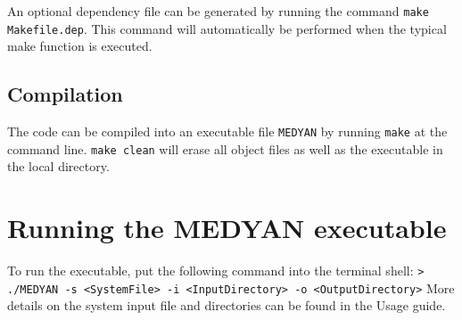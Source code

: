 \documentclass[11pt, oneside]{article}   	%
\begin{document}
An optional dependency file can be generated by running the command  \texttt{make Makefile.dep}. This command will automatically be performed when the typical make function is executed.

\subsection{Compilation}

The code can be compiled into an executable file \texttt{MEDYAN} by running \texttt{make} at the command line. \texttt{make clean} will erase all object files as well as the executable in the local directory.

\section {Running the MEDYAN executable}

To run the executable, put the following command into the terminal shell: \newline \newline\indent \texttt{> ./MEDYAN -s <SystemFile> -i <InputDirectory> -o <OutputDirectory>} \newline \newline More details on the system input file and directories can be found in the Usage guide.
\end{document}

